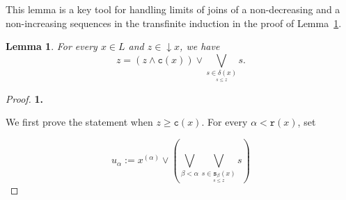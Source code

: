 \documentclass{article}
\newtheorem{lemma}[theorem]{Lemma}
\begin{document}
{This lemma is a key tool for handling limits of joins of a non-decreasing and a non-increasing sequences in the transfinite induction in the proof of Lemma~\ref{lemma.subelement.decomposition}. 
}

\begin{lemma}\label{lemma.subelement.decomposition}
    For every $x \in L$ and $ z \in \mathop{\downarrow}x$, we have 
    \[z = (z \wedge \texttt{c}(x)) \vee \bigvee_{\underset{s \le z}{s \in \delta(x)}} s.\]
\end{lemma}

\begin{proof}
    \textbf{1.} 
    {We first prove the statement when \(z\ge \texttt{c}(x)\). For every \(\alpha<\texttt r(x)\), set

\[u_{\alpha} := x^{(\alpha)}\vee \left(\bigvee_{\beta < \alpha} \bigvee_{\underset{s \le z}{s \in \texttt{s}_{\beta}(x)}}s\right)\]

}
\end{proof}
\end{document}
